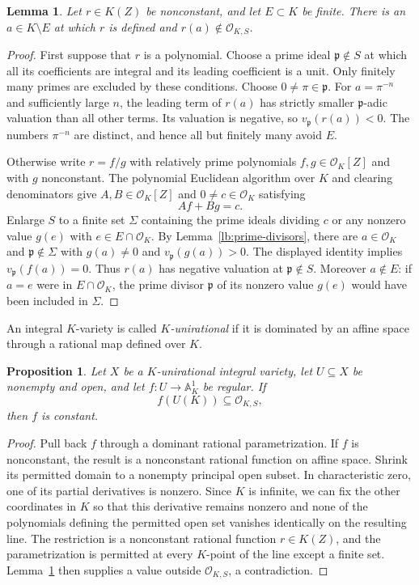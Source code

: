 \documentclass[11pt,a4paper]{article}
\newtheorem{proposition}[theorem]{Proposition}
\newtheorem{lemma}[theorem]{Lemma}
\theoremstyle{definition}
\newcommand{\OKS}{\mathcal O_{K,S}}
\newcommand{\A}{\mathbb A}
\begin{document}
\begin{lemma}\label{lb:rational-function}
Let $r\in K(Z)$ be nonconstant, and let $E\subset K$ be finite.
There is an $a\in K\setminus E$ at which $r$ is defined and
$r(a)\notin\OKS$.
\end{lemma}
\begin{proof}
First suppose that $r$ is a polynomial. Choose a prime ideal
$\mathfrak p\notin S$ at which all its coefficients are integral
and its leading coefficient is a unit. Only finitely many primes
are excluded by these conditions. Choose $0\ne\pi\in\mathfrak p$.
For $a=\pi^{-n}$ and sufficiently large $n$, the leading term of
$r(a)$ has strictly smaller $\mathfrak p$-adic valuation than all
other terms. Its valuation is negative, so
$v_{\mathfrak p}(r(a))<0$. The numbers $\pi^{-n}$ are distinct,
and hence all but finitely many avoid $E$.

Otherwise write $r=f/g$ with relatively prime polynomials
$f,g\in\mathcal O_K[Z]$ and with $g$ nonconstant. The polynomial
Euclidean algorithm over $K$ and clearing denominators give
$A,B\in\mathcal O_K[Z]$ and $0\ne c\in\mathcal O_K$ satisfying
\[
                              Af+Bg=c.
\]
Enlarge $S$ to a finite set $\Sigma$ containing the prime ideals
dividing $c$ or any nonzero value $g(e)$ with
$e\in E\cap\mathcal O_K$.
By Lemma~\ref{lb:prime-divisors}, there are $a\in\mathcal O_K$ and
$\mathfrak p\notin\Sigma$ with $g(a)\ne0$ and
$v_{\mathfrak p}(g(a))>0$. The displayed identity implies
$v_{\mathfrak p}(f(a))=0$. Thus $r(a)$ has negative valuation at
$\mathfrak p\notin S$. Moreover $a\notin E$: if $a=e$ were in
$E\cap\mathcal O_K$, the prime divisor $\mathfrak p$ of its
nonzero value $g(e)$ would have been included in $\Sigma$.
\end{proof}

An integral $K$-variety is called \emph{$K$-unirational} if it is
dominated by an affine space through a rational map defined over $K$.

\begin{proposition}\label{lb:unirational}
Let $X$ be a $K$-unirational integral variety, let $U\subseteq X$
be nonempty and open, and let $f:U\to\A^1_K$ be regular. If
\[
                              f(U(K))\subseteq\OKS,
\]
then $f$ is constant.
\end{proposition}
\begin{proof}
Pull back $f$ through a dominant rational parametrization. If $f$
is nonconstant, the result is a nonconstant rational function on
affine space. Shrink its permitted domain to a nonempty principal
open subset. In characteristic zero, one of its partial derivatives
is nonzero. Since $K$ is infinite, we can fix the other coordinates
in $K$ so that this derivative remains nonzero and none of the
polynomials defining the permitted open set vanishes identically
on the resulting line. The restriction is a nonconstant rational
function $r\in K(Z)$, and the parametrization is permitted at every
$K$-point of the line except a finite set. Lemma~\ref{lb:rational-function}
then supplies a value outside $\OKS$, a contradiction.
\end{proof}
\end{document}
